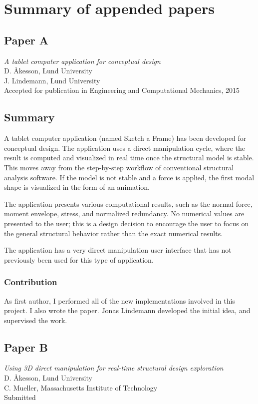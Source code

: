\chapter{Summary of appended papers}
\label{ch:Summary of appended papers}
\section{Paper A}
\textit{A tablet computer application for conceptual design} \\
D. Åkesson, Lund University \\
J. Lindemann, Lund University \\
Accepted for publication in Engineering and Computational Mechanics, 2015

\section*{Summary}

A tablet computer application (named Sketch a Frame) has been developed for conceptual design. The application uses a direct manipulation cycle, where the result is computed and visualized in real time once the structural model is stable. This moves away from the step-by-step workflow of conventional structural analysis software. If the model is not stable and a force is applied, the first modal shape is visualized in the form of an animation.

The application presents various computational results, such as the normal force, moment envelope, stress, and normalized redundancy. No numerical values are presented to the user; this is a design decision to encourage the user to focus on the general structural behavior rather than the exact numerical results. 

The application has a very direct manipulation user interface that has not previously been used for this type of application.

\subsection*{Contribution}
As first author, I performed all of the new implementations involved in this project. I also wrote the paper. Jonas Lindemann developed the initial idea, and supervised the work.

\newpage
\section{Paper B}
\textit{Using 3D direct manipulation for real-time structural design exploration} \\
D. Åkesson, Lund University \\
C. Mueller, Massachusetts Institute of Technology \\
Submitted

